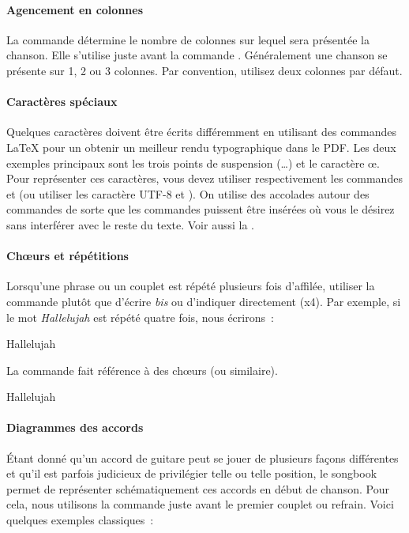 \paragraph{Agencement en colonnes}
La commande  détermine le nombre de colonnes sur
lequel sera présentée la chanson. Elle s'utilise juste avant la
commande . Généralement une chanson se présente
sur 1, 2 ou 3 colonnes. Par convention, utilisez deux colonnes par
défaut.

\begin{songbook}
\end{songbook}

\paragraph{Caractères spéciaux}
Quelques caractères doivent être écrits différemment en utilisant des
commandes \LaTeX{} pour un obtenir un meilleur rendu typographique
dans le PDF. Les deux exemples principaux sont les trois points de
suspension (\dots) et le caractère \oe{}. Pour représenter ces
caractères, vous devez utiliser respectivement les commandes
 et  (ou utiliser les caractère UTF-8
 et
). On utilise des accolades autour des commandes de sorte
que les commandes puissent être insérées où vous le désirez sans
interférer avec le reste du texte. Voir aussi la .

\paragraph{Ch\oe{}urs et répétitions}
Lorsqu'une phrase ou un couplet est répété plusieurs fois d'affilée,
utiliser la commande  plutôt que d'écrire \emph{bis} ou
d'indiquer directement (x4). Par exemple, si le mot \emph{Hallelujah}
est répété quatre fois, nous écrirons~:

\begin{songbook}
Hallelujah 
\end{songbook}

La commande  fait référence à des chœurs (ou
similaire).

\begin{songbook}
Hallelujah 
\end{songbook}

\paragraph{Diagrammes des accords}
Étant donné qu'un accord de guitare peut se jouer de plusieurs façons
différentes et qu'il est parfois judicieux de privilégier telle ou
telle position, le songbook permet de représenter schématiquement ces
accords en début de chanson. Pour cela, nous utilisons la commande
 juste avant le premier couplet ou refrain. Voici
quelques exemples classiques~:

